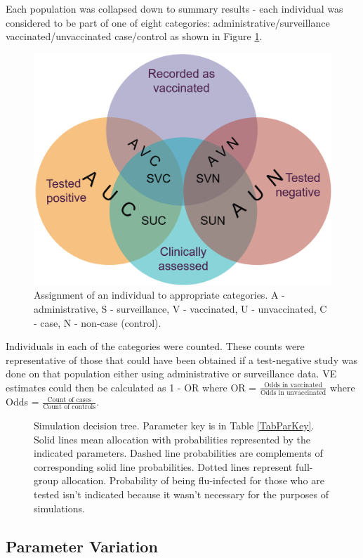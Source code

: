 \documentclass[11pt]{article}
\begin{document}
Each population was collapsed down to summary results - each individual was considered to be part of one of eight categories: administrative/surveillance vaccinated/unvaccinated case/control as shown in Figure \ref{PopAgg}.

\begin{figure}[h]
	\centering
		\includegraphics[width=0.5\linewidth]{../sim-diag/popagg-venn.png}
		\caption{
Assignment of an individual to appropriate categories. A - administrative, S - surveillance, V - vaccinated, U - unvaccinated, C - case, N - non-case (control). \label{PopAgg}
		}
\end{figure}

Individuals in each of the categories were counted. These counts were representative of those that could have been obtained if a test-negative study was done on that population either using administrative or surveillance data. VE estimates could then be calculated as 1 - OR where OR = $\frac{\text{Odds in vaccinated}}{\text{Odds in unvaccinated}}$ where Odds = $\frac{\text{Count of cases}}{\text{Count of controls}}$.

\pagebreak

\begin{figure}[H]
	\centering
		
		\caption{
Simulation decision tree. Parameter key is in Table \ref{TabParKey}. Solid lines mean allocation with probabilities represented by the indicated parameters. Dashed line probabilities are complements of corresponding solid line probabilities. Dotted lines represent full-group allocation. Probability of being flu-infected for those who are tested isn't indicated because it wasn't necessary for the purposes of simulations. \label{SimDiag}
		}
\end{figure}

\pagebreak
\subsection{Parameter Variation}
\end{document}
